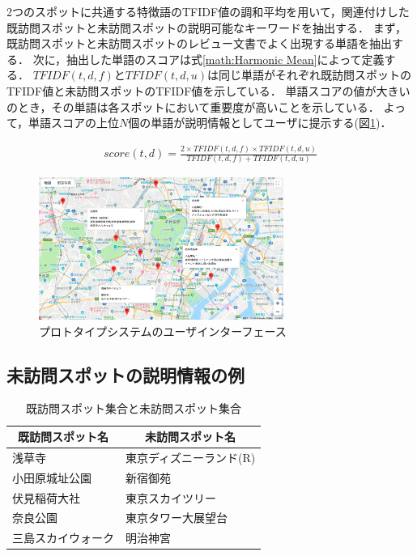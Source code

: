 \documentclass{deimj}
\begin{document}
2つのスポットに共通する特徴語のTFIDF値の調和平均を用いて，関連付けした既訪問スポットと未訪問スポットの説明可能なキーワードを抽出する．
まず，既訪問スポットと未訪問スポットのレビュー文書でよく出現する単語を抽出する．
次に，抽出した単語のスコアは式\ref{math:Harmonic Mean}によって定義する．
$TFIDF(t,d,f)$と$TFIDF(t,d,u)$は同じ単語がそれぞれ既訪問スポットのTFIDF値と未訪問スポットのTFIDF値を示している．
単語スコアの値が大きいのとき，その単語は各スポットにおいて重要度が高いことを示している．
よって，単語スコアの上位$N$個の単語が説明情報としてユーザに提示する(図\ref{fig:Photo_Map})．

\begin{eqnarray}
  score(t,d) = \frac{2 \times TFIDF(t,d,f) \times TFIDF(t,d,u)}{TFIDF(t,d,f) + TFIDF(t,d,u)}
  \label{math:Harmonic Mean}
\end{eqnarray}

\begin{figure}[t]
  \begin{center}
    \includegraphics[clip,width=8.0cm]{picture/Photo_Map.png}
    \caption{プロトタイプシステムのユーザインターフェース}
    \label{fig:Photo_Map}
   \end{center}
\end{figure}

\subsection{未訪問スポットの説明情報の例}
\label{subsec:未訪問スポットの説明情報の例}

\begin{table}[t]
  \caption{既訪問スポット集合と未訪問スポット集合}
  \label{table:既訪問スポット集合と未訪問スポット集合}
  \centering
  \begin{tabular}{l|l}
  \hline
  \multicolumn{1}{c|}{既訪問スポット名} & \multicolumn{1}{c}{未訪問スポット名} \\ \hline
  浅草寺                           & 東京ディズニーランド(R)                \\
  小田原城址公園                       & 新宿御苑                         \\
  伏見稲荷大社                        & 東京スカイツリー                     \\
  奈良公園                          & 東京タワー大展望台                    \\
  三島スカイウォーク                     & 明治神宮                         \\ \hline
  \end{tabular}
\end{table}
\end{document}
